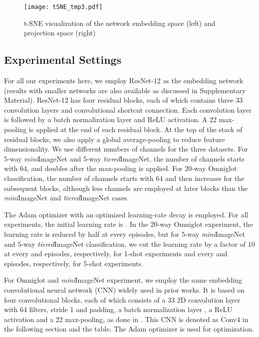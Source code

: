 \documentclass{article}
\begin{document}
\begin{figure*}[!htbp]
	\centering
	\texttt{[image: tSNE\_tmp3.pdf]}
	\caption{t-SNE visualization of the network embedding space (left) and projection space (right) }
	\label{fig:tSNE_diagram}
\end{figure*}

\subsection{Experimental Settings}



For all our experiments here, we employ ResNet-12 \cite{Resnet} as the embedding network (results with smaller networks are also available as discussed in Supplementary Material).
 ResNet-12 has four residual blocks, each of which contains three 33 convolution layers and convolutional shortcut connection. Each convolution layer is followed by a batch normalization layer and ReLU activation. A 22 max-pooling is applied at the end of each residual block. At the top of the stack of residual blocks, we also apply a global average-pooling to reduce feature dimensionality. We use different numbers of channels for the three datasets. For 5-way \textit{mini}ImageNet and 5-way \textit{tiered}ImageNet, the number of channels starts with 64, and doubles after the max-pooling is applied. For 20-way Omniglot classification, the number of channels starts with 64 and then increases for the subsequent blocks, although less channels are employed at later blocks than the \textit{mini}ImageNet and \textit{tiered}ImageNet cases.

The Adam optimizer \cite{Adam} with an optimized learning-rate decay is employed. 
For all experiments, the initial learning rate is . In the 20-way Omniglot experiment, the learning rate is reduced by half at every  episodes, but for 5-way \textit{mini}ImageNet and 5-way \textit{tiered}ImageNet classification, we cut the learning rate by a factor of 10 at every  and  episodes, respectively,  for 1-shot experiments and every  and  episodes, respectively, for 5-shot experiments.

\iffalse
For Omniglot and \textit{mini}ImageNet experiment, we employ the same embedding convolutional neural network (CNN) widely used in prior works. It is based on four convolutional blocks, each of which consists of a 33 2D convolution layer with 64 filters, stride 1 and padding, a batch normalization layer \cite{BN}, a ReLU activation and a 22 max-pooling, as done in \cite{PN,MN}. This CNN is denoted as Conv4 in the following section and the table. The Adam optimizer \cite{Adam} is used for optimization.
\end{document}
